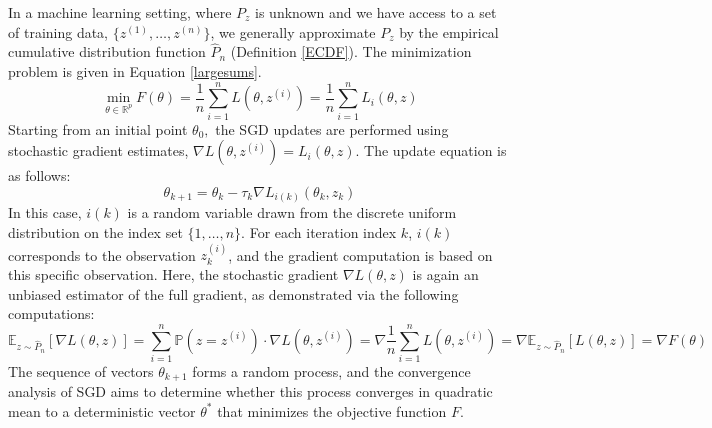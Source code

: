 \begin{comment}
Starting from an initial point $\theta_0$, the SGD updates are performed using the stochastic gradient estimate, computed based on the specific draw $z_k$ for each iteration index $k$. The update equation is as follows:
\begin{equation*}\tag{4.4.2}
\theta_{k+1} = \theta_k - \tau_k \nabla L(\theta_k, z_k)
\end{equation*}
In this equation, $\theta_k$ is the current parameter estimate, $\tau_k$ is the step size at iteration $k$, and $\nabla L(\theta_k, z_k)$ is the stochastic gradient estimate based on the draw $z_k$ from the distribution $P_z$.  
\end{comment}
In a machine learning setting, where $P_z$ is unknown and we have access to a set of training data, $\{z^{(1)},\ldots,z^{(n)}\}$, we generally approximate $P_z$ by the empirical cumulative distribution function $\hat{P}_{n}$ (Definition \ref{ECDF}). The minimization problem is given in Equation \eqref{largesums}.
\begin{equation*}\tag{4.4.4}
\underset{\theta\in\mathbb{R}^{p}}{\min}F(\theta) = \frac{1}{n}\sum_{i=1}^{n}L(\theta,z^{(i)}) = \frac{1}{n}\sum_{i=1}^{n}L_{i}(\theta,z)    
\end{equation*}
Starting from an initial point $\theta_{0},$ the SGD updates are performed using stochastic gradient estimates, $\nabla L(\theta,z^{(i)})=L_{i}(\theta,z)$. The update equation is as follows: 
\begin{equation*}\label{SGD_update}\tag{5.4.3}
\theta_{k+1} = \theta_k - \tau_k \nabla L_{i(k)}(\theta_k,z_{k})
\end{equation*}
In this case, $i(k)$ is a random variable drawn from the discrete uniform distribution on the index set $\{1, \ldots, n\}$. For each iteration index $k$, $i(k)$ corresponds to the observation $z_{k}^{(i)}$, and the gradient computation is based on this specific observation. Here, the stochastic gradient $\nabla L(\theta, z)$ is again an unbiased estimator of the full gradient, as demonstrated via the following computations: 
\begin{equation*}\tag{5.4.4}
\mathbb{E}_{z \sim \hat{P}_{n}}[\nabla L(\theta, z)] = \sum_{i=1}^{n}\mathbb{P}(z = z^{(i)})\cdot \nabla L(\theta, z^{(i)}) =  \nabla\frac{1}{n}\sum_{i=1}^{n}L(\theta, z^{(i)}) = \nabla\mathbb{E}_{z \sim \hat{P}_{n}}[L(\theta, z)] = \nabla F(\theta)
\end{equation*}
 The sequence of vectors $\theta_{k+1}$ forms a random process, and the convergence analysis of SGD aims to determine whether this process converges in quadratic mean to a deterministic vector $\theta^*$ that minimizes the objective function $F$.
